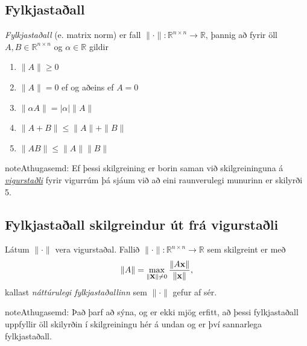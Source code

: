 \documentclass[letterpaper,10pt,icelandic]{sphinxmanual}
\begin{document}
\subsection{Fylkjastaðall}
\label{kafli08:id1}\label{kafli08:index-9}
\emph{Fylkjastaðall} (e. matrix norm) er fall
\(\|\cdot\|:{\mathbb  R}^{n\times n} \to {\mathbb  R}\), þannig að
fyrir öll \(A,B \in {\mathbb  R}^{n\times n}\) og
\(\alpha \in {\mathbb  R}\) gildir
\begin{enumerate}
\item {} 
\(\|A\| \geq 0\)

\item {} 
\(\|A\| = 0\) ef og aðeins ef \(A=0\)

\item {} 
\(\| \alpha A\| = |\alpha|\|A\|\)

\item {} 
\(\|A+B\| \leq \|A\| + \|B\|\)

\item {} 
\(\|AB\| \leq \|A\|\|B\|\)

\end{enumerate}

\begin{notice}{note}{Athugasemd:}
Ef þessi skilgreining er borin saman við skilgreininguna á {\hyperref[kafli08:vigurstadall]{\emph{vigurstaðli}}}
fyrir vigurrúm þá sjáum við að eini raunverulegi munurinn er skilyrði 5.
\end{notice}


\subsection{Fylkjastaðall skilgreindur út frá vigurstaðli}
\label{kafli08:fylkjastaall-skilgreindur-ut-fra-vigurstali}\label{kafli08:index-10}
Látum \(\|\cdot\|\) vera vigurstaðal. Fallið
\(\|\cdot\|:{\mathbb  R}^{n\times n} \to {\mathbb  R}\) sem
skilgreint er með
\begin{gather}
\begin{split}\|A\| = \max_{\|\mbox{${\bf x}$}\| \neq 0}
\frac{\|A\mbox{${\bf x}$}\|}{\|\mbox{${\bf x}$}\|},\end{split}\notag
\end{gather}
kallast \emph{náttúrulegi fylkjastaðallinn} sem \(\|\cdot\|\) gefur af
sér.

\begin{notice}{note}{Athugasemd:}
Það þarf að sýna, og er ekki mjög erfitt, að þessi fylkjastaðall
uppfyllir öll skilyrðin í skilgreiningu hér á undan og er því sannarlega
fylkjastaðall.
\end{notice}
\end{document}
